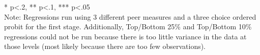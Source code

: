 \begin{sidewaystable}[htb]
\begin{threeparttable}
\begin{tabular}{l|c|c|c|c|c|c|c|c}
      \hline
      \hline
    \end{tabular}
    \begin{tablenotes}
    \item{* p<.2, ** p<.1, *** p<.05 \\Note: Regressions run using 3 different peer measures and a three choice ordered probit for the first stage. Additionally, Top/Bottom 25\% and Top/Bottom 10\% regressions could not be run because there is too little variance in the data at those levels (most likely because there are too few observations).}
    \end{tablenotes}
  \end{threeparttable}
\end{sidewaystable}

